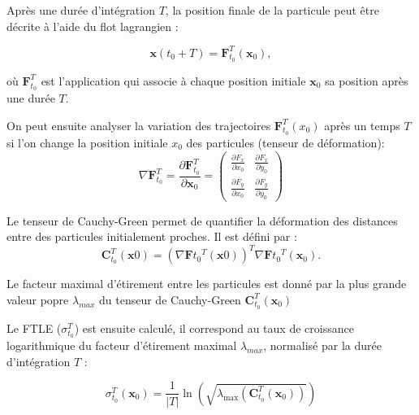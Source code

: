 \documentclass[11pt,a4paper,oneside]{report}
\begin{document}
	Après une durée d'intégration $T$, la position finale de la particule peut être décrite à l'aide du flot lagrangien :
	
	\begin{equation}
		\mathbf{x}(t_0+T)
		=
		\mathbf{F}_{t_0}^{T}(\mathbf{x}_0),
	\end{equation}
	
	où $\mathbf{F}_{t_0}^{T}$ est l'application qui associe à chaque position initiale $\mathbf{x}_0$ sa position après une durée $T$.
	
	On peut ensuite analyser la variation des trajectoires $\mathbf{F}_{t_0}^T(x_0)$ après un temps $T$ si l'on change la position initiale $x_0$ des particules (tenseur de déformation): 
	\begin{equation}
		\nabla \mathbf{F}_{t_0}^{T}
		=
		\frac{\partial \mathbf{F}_{t_0}^{T}}{\partial \mathbf{x}_0}
		=
		\begin{pmatrix}
			\frac{\partial F_x}{\partial x_0} &
			\frac{\partial F_x}{\partial y_0} \\[6pt]
			\frac{\partial F_y}{\partial x_0} &
			\frac{\partial F_y}{\partial y_0}
		\end{pmatrix}
	\end{equation}
	
	Le tenseur de Cauchy-Green permet de quantifier la déformation des distances entre des particules initialement proches. Il est défini par :
	\begin{equation}
		\mathbf{C}_{t_0}^{T}(\mathbf{x}0)
		=
		\left(
		\nabla\mathbf{F}{t_0}^{T}(\mathbf{x}0)
		\right)^{T}
		\nabla\mathbf{F}{t_0}^{T}(\mathbf{x}_0).
	\end{equation}
	
	Le facteur maximal d'étirement entre les particules est donné par la plus grande valeur popre $\lambda_{max}$ du tenseur de Cauchy-Green $\mathbf{C}_{t_0}^{T} (\mathbf{x}_0)$
	
	Le FTLE ($\sigma_{t_0}^{T}$) est ensuite calculé, il correspond au taux de croissance logarithmique du facteur d'étirement maximal $\lambda_{max}$, normalisé par la durée d'intégration $T$ :
	
	\begin{equation}
		\sigma_{t_0}^{T}(\mathbf{x}_0)
		=
		\frac{1}{|T|}
		\ln\left(
		\sqrt{
			\lambda_{\max}\left(
			\mathbf{C}_{t_0}^{T}(\mathbf{x}_0)
			\right)
		}
		\right)
	\end{equation}
	
\end{document}
